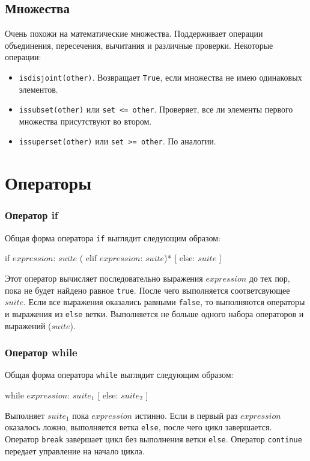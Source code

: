 \subsection{Множества}
Очень похожи на математические множества. Поддерживает операции объединения, пересечения, вычитания и различные проверки. Некоторые операции:
\begin{itemize}
  \item \lstinline{isdisjoint(other)}. Возвращает \lstinline{True}, если множества не имею одинаковых элементов.
  \item \lstinline{issubset(other)} или \lstinline{set <= other}. Проверяет, все ли элементы первого множества присутствуют во втором.
  \item \lstinline{issuperset(other)} или \lstinline{set >= other}. По аналогии.
\end{itemize}

\section{Операторы}
\label{sec:py-statements}

\subsubsection{Оператор if}
Общая форма оператора \lstinline{if} выглядит следующим образом:
\begin{pylst}{}{}
if $expression$: $suite$
( elif $expression$: $suite$)*
[ else: $suite$ ]
\end{pylst}

Этот оператор вычисляет последовательно выражения $expression$ до тех пор, пока не будет найдено равное \lstinline{true}. После чего выполняется соответсвующее $suite$. Если все выражения оказались равными \lstinline{false}, то выполняются операторы и выражения из \lstinline{else} ветки. Выполняется не больше одного набора операторов и выражений ($suite$).

\subsubsection{Оператор while}
Общая форма оператора \lstinline{while} выглядит следующим образом:
\begin{pylst}{}{}
while $expression$: $suite_1$
[ else: $suite_2$ ]
\end{pylst}

Выполняет $suite_1$ пока $expression$ истинно. Если в первый раз $expression$ оказалось ложно, выполняется ветка \lstinline{else}, после чего цикл завершается. Оператор \lstinline{break} завершает цикл без выполнения ветки \lstinline{else}. Оператор \lstinline{continue} передает управление на начало цикла.

